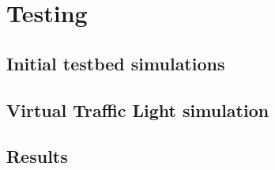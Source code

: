 \chapter{Testing}
\label{chp:Testing} 

\section{Initial testbed simulations}

\section{Virtual Traffic Light simulation}

\section{Results}